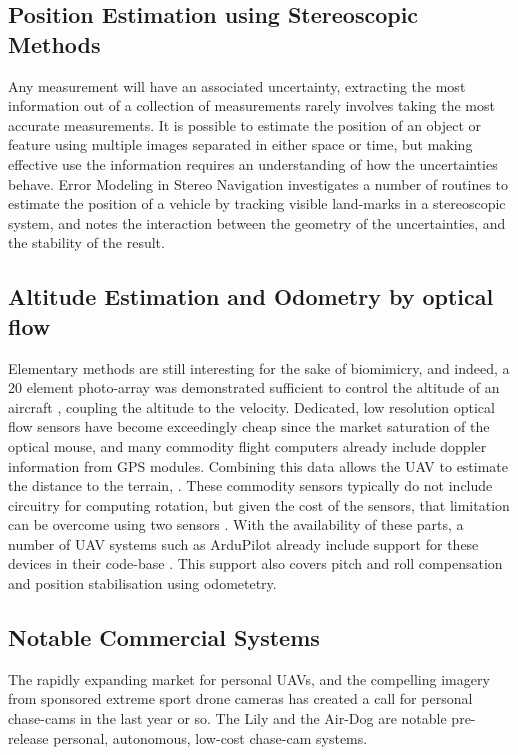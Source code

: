 \documentclass[a4paper, 11pt, titlepage]{article}
\begin{document}
    \subsection{Position Estimation using Stereoscopic Methods}
      Any measurement will have an associated uncertainty, extracting the most information out of a collection of measurements rarely involves taking the most accurate measurements.  It is possible to estimate the position of an object or feature using multiple images separated in either space or time, but making effective use the information requires an understanding of how the uncertainties behave.  Error Modeling in Stereo Navigation \cite{stereoUnc} investigates a number of routines to estimate the position of a vehicle by tracking visible land-marks in a stereoscopic system, and notes the interaction between the geometry of the uncertainties, and the stability of the result.

    \subsection{Altitude Estimation and Odometry by optical flow}
      Elementary methods are still interesting for the sake of biomimicry, and indeed, a 20 element photo-array was demonstrated sufficient to control the altitude of an aircraft \cite{optoAlt}, coupling the altitude to the velocity.
      Dedicated, low resolution optical flow sensors have become exceedingly cheap since the market saturation of the optical mouse, and many commodity flight computers already include doppler information from GPS modules. 
      Combining this data allows the UAV to estimate the distance to the terrain, \cite{RemTerrain}.  These commodity sensors typically do not include circuitry for computing rotation, but given the cost of the sensors, that limitation can be overcome using two sensors \cite{FlowRot}.
      With the availability of these parts, a number of UAV systems such as ArduPilot already include support for these devices in their code-base \cite{ArduFlow}.
      This support also covers pitch and roll compensation and position stabilisation using odometetry.

    \subsection{Notable Commercial Systems}
      The rapidly expanding market for personal UAVs, and the compelling imagery from sponsored extreme sport drone cameras has created a call for personal chase-cams in the last year or so.  The Lily \cite{Lily} and the Air-Dog \cite{AirDog} are notable pre-release personal, autonomous, low-cost chase-cam systems.
\end{document}
